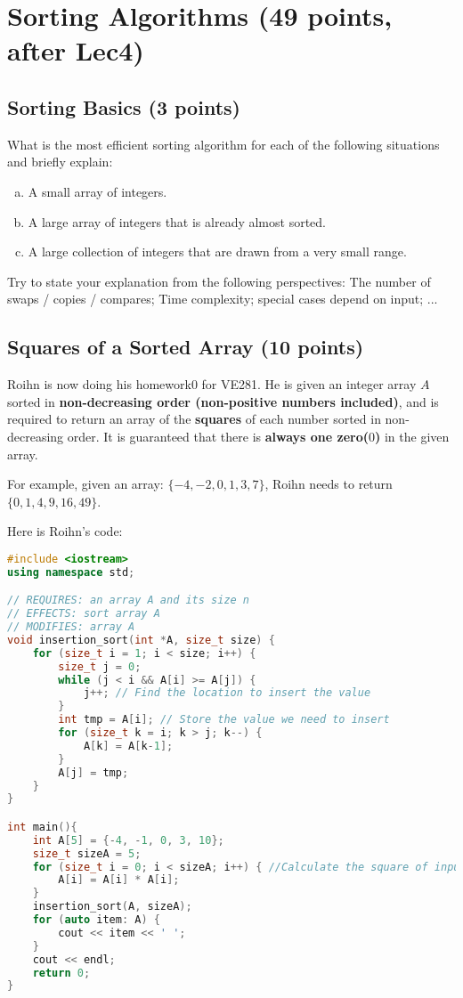 \documentclass[11pt]{exam}
\begin{document}
\section{Sorting Algorithms (49 points, after Lec4)}

\subsection{Sorting Basics (3 points)}
What is the most efficient sorting algorithm for each of the following situations and briefly explain:
\begin{enumerate}[(a)]
\item A small array of integers.
\item A large array of integers that is already almost sorted.
\item A large collection of integers that are drawn from a very small range.
\end{enumerate}
Try to state your explanation from the following perspectives: The number of swaps / copies / compares; Time complexity; special cases depend on input; ...
\begin{solution}
\end{solution}

\subsection{Squares of a Sorted Array (10 points)}
Roihn is now doing his homework0 for VE281. He is given an integer array $A$ sorted in \textbf{non-decreasing order (non-positive numbers included)}, and is required to return an array of the \textbf{squares} of each number sorted in non-decreasing order. It is guaranteed that there is \textbf{always one zero($0$)} in the given array. 

For example, given an array: $\{-4,-2,0,1,3,7\}$, Roihn needs to return $\{0,1,4,9,16,49\}$.

Here is Roihn's code:
\begin{lstlisting}[language=c++]
#include <iostream>
using namespace std;

// REQUIRES: an array A and its size n
// EFFECTS: sort array A
// MODIFIES: array A
void insertion_sort(int *A, size_t size) {
    for (size_t i = 1; i < size; i++) {
        size_t j = 0;
        while (j < i && A[i] >= A[j]) {
            j++; // Find the location to insert the value
        }
        int tmp = A[i]; // Store the value we need to insert
        for (size_t k = i; k > j; k--) {
            A[k] = A[k-1];
        }
        A[j] = tmp;
    }
}

int main(){
    int A[5] = {-4, -1, 0, 3, 10};
    size_t sizeA = 5;
    for (size_t i = 0; i < sizeA; i++) { //Calculate the square of input array
        A[i] = A[i] * A[i];
    }
    insertion_sort(A, sizeA);
    for (auto item: A) {
        cout << item << ' ';
    }
    cout << endl;
    return 0;
}
\end{lstlisting}
\end{document}
